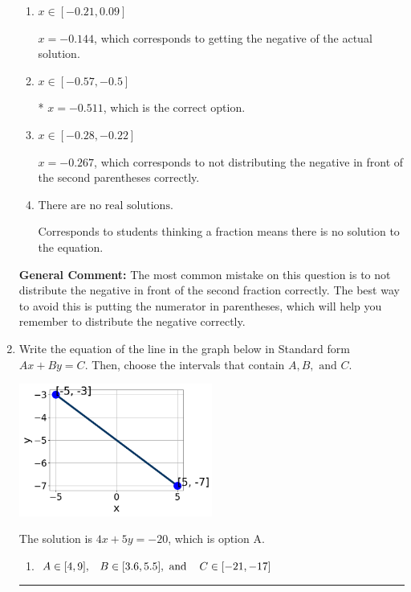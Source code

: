 \documentclass{extbook}[14pt]
\newcommand{\litem}[1]{\item #1

\rule{\textwidth}{0.4pt}}
\begin{document}
\begin{enumerate}
{\begin{enumerate}[label=\Alph*.]
$x = 0.267$, which corresponds to not distributing the negative in front of the first parentheses correctly.
\item \( x \in [-0.21, 0.09] \)

$x = -0.144$, which corresponds to getting the negative of the actual solution.
\item \( x \in [-0.57, -0.5] \)

* $x = -0.511$, which is the correct option.
\item \( x \in [-0.28, -0.22] \)

$x = -0.267$, which corresponds to not distributing the negative in front of the second parentheses correctly.
\item \( \text{There are no real solutions.} \)

Corresponds to students thinking a fraction means there is no solution to the equation.
\end{enumerate}

\textbf{General Comment:} The most common mistake on this question is to not distribute the negative in front of the second fraction correctly. The best way to avoid this is putting the numerator in parentheses, which will help you remember to distribute the negative correctly.
}
\litem{
Write the equation of the line in the graph below in Standard form $Ax+By=C$. Then, choose the intervals that contain $A, B, \text{ and } C$.

\begin{center}
    \includegraphics[width=0.5\textwidth]{../Figures/linearGraphToStandardA.png}
\end{center}



The solution is \( 4x + 5y = -20 \), which is option A.\begin{enumerate}[label=\Alph*.]
\item \( A \in [4, 9], \hspace{3mm} B \in [3.6, 5.5], \text{ and } \hspace{3mm} C \in [-21, -17] \)


\end{enumerate}}
\end{enumerate}
\end{document}
